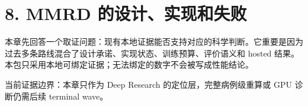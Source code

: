 \section{8. MMRD 的设计、实现和失败}

本章先回答一个取证问题：现有本地证据能否支持对应的科学判断。它重要是因为过去多条路线混合了设计承诺、实现状态、训练预算、评价语义和 hosted 结果。本包只采用本地可绑定证据；无法绑定的数字不会被写成性能结论。



当前证据边界：本章只作为 Deep Research 的定位层，完整病例级重算或 GPU 诊断仍需后续 terminal wave。



\clearpage